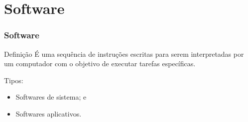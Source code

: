 \documentclass[aspectratio=169]{beamer} %
\begin{document}
\section{Software}

\begin{frame}
	\frametitle{Software}
		
	\begin{block}{Defini\c cão}
		É uma sequência de instruções escritas para serem interpretadas por um computador com o objetivo de executar tarefas específicas.
	\end{block}\vfill
	
	Tipos:
	\begin{itemize}
		\item Softwares de sistema; e
		\item Softwares aplicativos.
	\end{itemize}
\end{frame}
\end{document}
